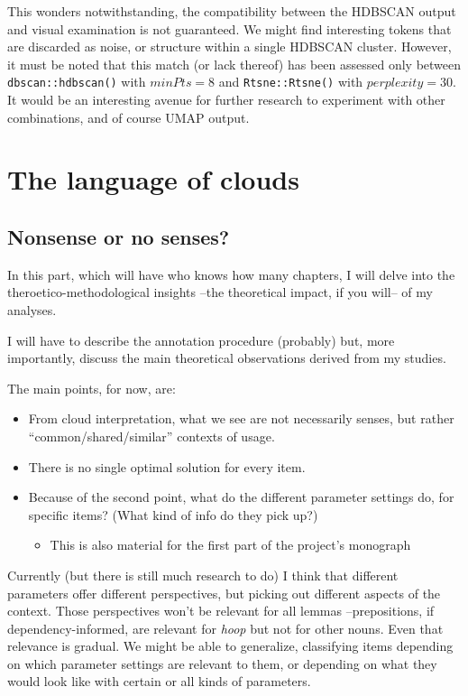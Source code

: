 \documentclass[
]{book}
\providecommand{\tightlist}{%
  \setlength{\itemsep}{0pt}\setlength{\parskip}{0pt}}
\begin{document}
This wonders notwithstanding, the compatibility between the HDBSCAN output and visual examination is not guaranteed. We might find interesting tokens that are discarded as noise, or structure within
a single HDBSCAN cluster. However, it must be noted that this match (or lack thereof)
has been assessed only between \texttt{dbscan::hdbscan()} with \(minPts = 8\) and
\texttt{Rtsne::Rtsne()} with \(perplexity = 30\). It would be an interesting avenue for further research to experiment with other combinations, and of course UMAP output.

\hypertarget{part-the-language-of-clouds}{%
\part{The language of clouds}\label{part-the-language-of-clouds}}

\hypertarget{nonsense-or-no-senses}{%
\chapter{Nonsense or no senses?}\label{nonsense-or-no-senses}}

In this part, which will have who knows how many chapters, I will delve into the
theroetico-methodological insights --the theoretical impact, if you will-- of
my analyses.

I will have to describe the annotation procedure (probably) but, more importantly,
discuss the main theoretical observations derived from my studies.

The main points, for now, are:

\begin{itemize}
\item
  From cloud interpretation, what we see are not necessarily senses, but rather
  ``common/shared/similar'' contexts of usage.
\item
  There is no single optimal solution for every item.
\item
  Because of the second point, what do the different parameter settings do,
  for specific items? (What kind of info do they pick up?)

  \begin{itemize}
  \tightlist
  \item
    This is also material for the first part of the project's monograph
  \end{itemize}
\end{itemize}

Currently (but there is still much research to do) I think that
different parameters offer different perspectives, but picking out different aspects
of the context.
Those perspectives won't be relevant for all lemmas --prepositions, if dependency-informed,
are relevant for \emph{hoop} but not for other nouns. Even that relevance is gradual.
We might be able to generalize, classifying items depending on which parameter settings
are relevant to them, or depending on what they would look like with certain or all kinds
of parameters.
\end{document}
